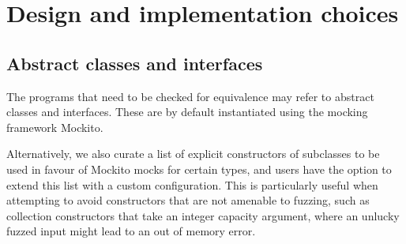 \documentclass[sigconf,review,anonymous]{acmart}
\begin{document}
  \section{Design and implementation choices} \label{sec:implementation}

  

\subsection{Abstract classes and interfaces}\label{sec:abstract}

The programs that need to be checked for equivalence may refer to
abstract classes and interfaces. These are by default instantiated
using the mocking framework Mockito.

Alternatively, we also curate a
list of explicit constructors
of subclasses to be used in favour of Mockito mocks for certain types, and users
have the option to extend this list with a custom configuration.
%
This is particularly useful when attempting to avoid constructors that are not amenable to fuzzing, such as
collection constructors that take an integer capacity argument, where an
unlucky fuzzed input might lead to an out of memory error.
\end{document}
